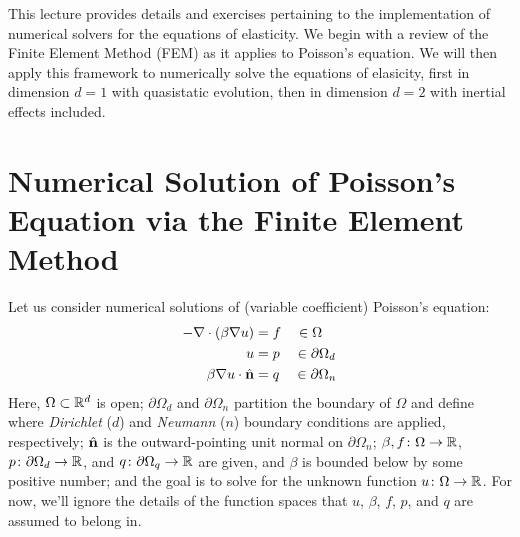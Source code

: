 
This lecture provides details and exercises pertaining to the implementation of numerical solvers for the equations of elasticity. We begin with a review of the Finite Element Method (FEM) as it applies to Poisson's equation. We will then apply this framework to numerically solve the equations of elasicity, first in dimension $d = 1$ with quasistatic evolution, then in dimension $d = 2$ with inertial effects included.

\section{Numerical Solution of Poisson's Equation via the Finite Element Method}

Let us consider numerical solutions of (variable coefficient) Poisson's equation:
\begin{subequations}
\begin{align}\label{eq:poisson.strong}
-\nabla \cdot \left( \beta \nabla u \right) & = f \quad \in \Omega \\
u & = p \quad \in \partial \Omega_d \\
\beta \nabla u \cdot \hat{\mathbf{n}} & = q \quad \in \partial \Omega_n
\end{align}
\end{subequations}
Here, $\Omega \subset \mathbb{R}^d$ is open; $\partial \Omega_d$ and $\partial \Omega_n$ partition the boundary of $\Omega$ and define where \emph{Dirichlet} ($d$) and \emph{Neumann} ($n$) boundary conditions are applied, respectively; $\hat{\mathbf{n}}$ is the outward-pointing unit normal on $\partial \Omega_n$; $\beta, f \colon \Omega \to \mathbb{R}$, $p \colon \partial \Omega_d \to \mathbb{R}$, and $q \colon \partial \Omega_q \to \mathbb{R}$ are given, and $\beta$ is bounded below by some positive number; and the goal is to solve for the unknown function $u \colon \Omega \to \mathbb{R}$. For now, we'll ignore the details of the function spaces that $u$, $\beta$, $f$, $p$, and $q$ are assumed to belong in.

